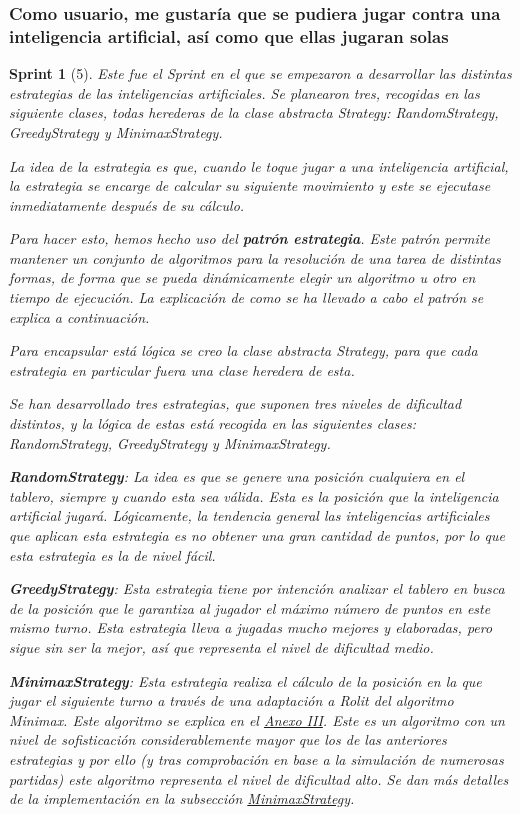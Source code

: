 \documentclass[12pt,a4paper,openright]{book}
\theoremstyle{break}
\newtheorem*{sprint}{Sprint}
\begin{document}
\subsubsection{Como usuario, me gustaría que se pudiera jugar contra una inteligencia artificial, así como que ellas jugaran solas}
\begin{sprint}[5]
Este fue el Sprint en el que se empezaron a desarrollar las distintas estrategias de las inteligencias artificiales. Se planearon tres, recogidas en las siguiente clases, todas herederas de la clase abstracta Strategy: RandomStrategy, GreedyStrategy y MinimaxStrategy.

La idea de la estrategia es que, cuando le toque jugar a una inteligencia artificial, la estrategia se encarge de calcular su siguiente movimiento y este se ejecutase inmediatamente después de su cálculo.

Para hacer esto, hemos hecho uso del \textbf{patrón estrategia}. Este patrón permite mantener un conjunto de algoritmos para la resolución de una tarea de distintas formas, de forma que se pueda dinámicamente elegir un algoritmo u otro en tiempo de ejecución. La explicación de como se ha llevado a cabo el patrón se explica a continuación.

Para encapsular está lógica se creo la clase abstracta Strategy, para que cada estrategia en particular fuera una clase heredera de esta.

Se han desarrollado tres estrategias, que suponen tres niveles de dificultad distintos, y la lógica de estas está recogida en las siguientes clases: RandomStrategy, GreedyStrategy y MinimaxStrategy.

\textbf{RandomStrategy}:
La idea es que se genere una posición cualquiera en el tablero, siempre y cuando esta sea válida. Esta es la posición que la inteligencia artificial jugará.
Lógicamente, la tendencia general las inteligencias artificiales que aplican esta estrategia es no obtener una gran cantidad de puntos, por lo que esta estrategia es la de nivel fácil.

\textbf{GreedyStrategy}:
Esta estrategia tiene por intención analizar el tablero en busca de la posición que le garantiza al jugador el máximo número de puntos en este mismo turno. Esta estrategia lleva a jugadas mucho mejores y elaboradas, pero sigue sin ser la mejor, así que representa el nivel de dificultad medio.

\textbf{MinimaxStrategy}:
Esta estrategia realiza el cálculo de la posición en la que jugar el siguiente turno a través de una adaptación a Rolit del algoritmo Minimax. Este algoritmo se explica en el \hyperref[ch:AnexoIII]{Anexo III}. Este es un algoritmo con un nivel de sofisticación considerablemente mayor que los de las anteriores estrategias y por ello (y tras comprobación en base a la simulación de numerosas partidas) este algoritmo representa el nivel de dificultad alto. Se dan más detalles de la implementación en la subsección  \hyperref[subsubsec:MinimaxStrategy]{MinimaxStrategy}.


\end{sprint}
\end{document}
